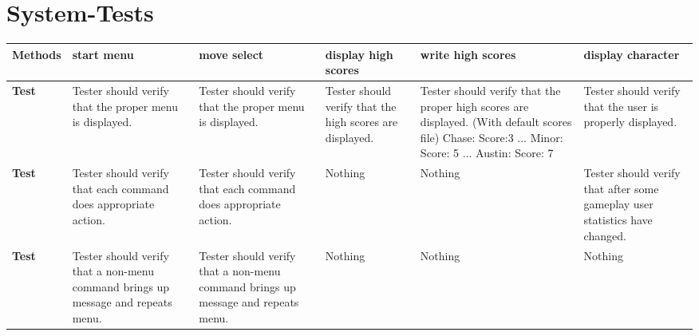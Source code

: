 \documentclass{article}
\begin{document}
\section{System-Tests}
{
\small
\begin{tabular}{|m{1.5cm}|m{1.5cm}|m{1.5cm}|m{1.5cm}|m{1.5cm}|m{1.5cm}|}
  \hline
  \textbf{Methods} & \textbf{start menu} & \textbf{move select} &
  \textbf{display high scores} & \textbf{write high scores} &
  \textbf{display character} \\
  \hline
  \textbf{Test} &
  Tester should verify that the proper menu is displayed. &
  Tester should verify that the proper menu is displayed. &
  Tester should verify that the high scores are displayed. &
  Tester should verify that the proper high scores are displayed.
  (With default scores file)
  Chase: Score:3 ... Minor: Score: 5 ... Austin: Score: 7 &
  Tester should verify that the user is properly displayed.\\
  \hline
  \textbf{Test} &
  Tester should verify that each command does appropriate action. &
  Tester should verify that each command does appropriate action. &
  Nothing &
  Nothing &
  Tester should verify that after some gameplay user statistics have changed.\\
  \hline
  \textbf{Test} &
  Tester should verify that a non-menu command brings up message and repeats menu. &
  Tester should verify that a non-menu command brings up message and repeats menu. &
  Nothing &
  Nothing &
  Nothing \\
  \hline
\end{tabular}
}
\end{document}
